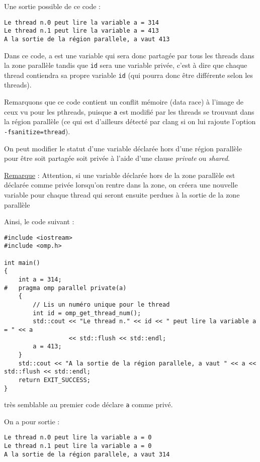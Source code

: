 \documentclass[fleqn,11pt]{article}
\begin{document}
Une sortie possible de ce code :
\begin{verbatim}
Le thread n.0 peut lire la variable a = 314
Le thread n.1 peut lire la variable a = 413
A la sortie de la région parallele, a vaut 413
\end{verbatim}

Dans ce code, a est une variable qui sera donc partagée par tous les threads dans la zone parallèle
tandis que \texttt{id} sera une variable privée, c'est à dire que chaque thread contiendra sa propre
variable \texttt{id} (qui pourra donc être différente selon les threads).

Remarquons que ce code contient un conflit mémoire (data race) à l'image de ceux vu pour les pthreads,
puisque \texttt{a} est modifié par les threads se trouvant dans la région parallèle (ce qui est d'ailleurs
détecté par clang si on lui rajoute l'option \texttt{-fsanitize=thread}).

On peut modifier le statut d'une variable déclarée hors d'une région parallèle pour être soit partagée soit  privée à l'aide d'une clause \textsl{private} ou \textsl{shared}.

\underline{Remarque} : Attention, si une variable déclarée hors de la zone parallèle est déclarée comme
privée lorsqu'on rentre dans la zone, on créera une nouvelle variable pour chaque thread qui seront ensuite
perdues à la sortie de la zone parallèle

Ainsi, le code suivant :
\begin{lstlisting}
#include <iostream>
#include <omp.h>

int main()
{
    int a = 314;
#   pragma omp parallel private(a)
    {
        // Lis un numéro unique pour le thread
        int id = omp_get_thread_num();
        std::cout << "Le thread n." << id << " peut lire la variable a = " << a 
                  << std::flush << std::endl;
        a = 413;
    }
    std::cout << "A la sortie de la région parallele, a vaut " << a << std::flush << std::endl;
    return EXIT_SUCCESS;
}
\end{lstlisting}

très semblable au premier code déclare \texttt{a} comme privé. 

On a pour sortie :
\begin{verbatim}
Le thread n.0 peut lire la variable a = 0
Le thread n.1 peut lire la variable a = 0
A la sortie de la région parallele, a vaut 314
\end{verbatim}
\end{document}
